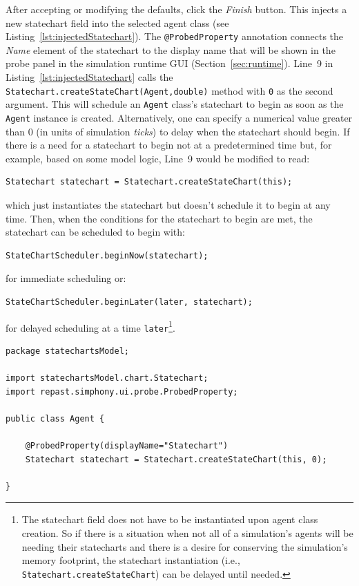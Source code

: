 \documentclass[11pt]{amsart}
\begin{document}
After accepting or modifying the defaults, click the \emph{Finish} button. This injects a new statechart field into the selected agent class (see Listing~\ref{lst:injectedStatechart}). The \texttt{@ProbedProperty} annotation connects the \emph{Name} element of the statechart to the display name that will be shown in the probe panel in the simulation runtime GUI (Section~\ref{sec:runtime}). Line~9 in Listing~\ref{lst:injectedStatechart} calls the \texttt{Statechart.createStateChart(Agent,double)} method with \texttt{0} as the second argument. This will schedule an \texttt{Agent} class's statechart to begin as soon as the \texttt{Agent} instance  is created. Alternatively, one can specify a numerical value greater than 0 (in units of simulation \emph{ticks}) to delay when the statechart should begin. If there is a need for a statechart to begin not at a predetermined time but, for example, based on some model logic, Line~9 would be modified to read:
\begin{verbatim}Statechart statechart = Statechart.createStateChart(this);\end{verbatim}
which just instantiates the statechart but doesn't schedule it to begin at any time. Then, when the conditions for the statechart to begin are met, the statechart can be scheduled to begin with:
\begin{verbatim}StateChartScheduler.beginNow(statechart);\end{verbatim}
for immediate scheduling or:
\begin{verbatim}StateChartScheduler.beginLater(later, statechart);\end{verbatim}
for delayed scheduling at a time \texttt{later}\footnote{The statechart field does not have to be instantiated upon agent class creation. So if there is a  situation when not all of a simulation's agents will be needing their statecharts and there is a desire for conserving the simulation's memory footprint, the statechart instantiation (i.e., \texttt{Statechart.createStateChart}) can be delayed until needed.}.

\noindent\begin{minipage}[h]{\textwidth}
\vspace{.2in}
\lstset{language=java,caption=Agent class with the default injected statechart field.,label=lst:injectedStatechart}
\begin{lstlisting}
package statechartsModel;

import statechartsModel.chart.Statechart;
import repast.simphony.ui.probe.ProbedProperty;

public class Agent {

	@ProbedProperty(displayName="Statechart")
	Statechart statechart = Statechart.createStateChart(this, 0);

}
\end{lstlisting}
\vspace{.2in}
\end{minipage}
\end{document}
